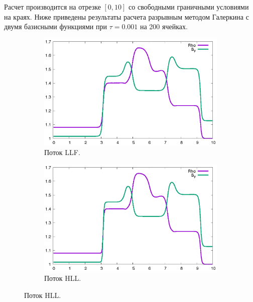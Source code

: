 \documentclass[14pt, a4paper, fleqn]{extreport}
\begin{document}
	Расчет производится на отрезке $[0, 10]$ со свободными граничными
	условиями на краях.
	Ниже приведены результаты расчета разрывным методом Галеркина
	с двумя базисными функциями при $\tau = 0.001$ на 200 ячейках.
	\begin{figure}[H]
		\centering
		\caption{$\rho$ и $B_y$ при $t = 1800\tau$.}
		\begin{subfigure}{0.75\textwidth}
			\centering
			\caption{Поток LLF.}
			\includegraphics[width=\textwidth]{1D_LLF.eps}
		\end{subfigure}
		\begin{subfigure}{0.75\textwidth}
			\centering
			\caption{Поток HLL.}
			\includegraphics[width=\textwidth]{1D_HLLE.eps}
		\end{subfigure}
	\end{figure}
\end{document}

